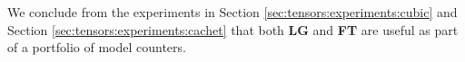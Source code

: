We conclude from the experiments in Section \ref{sec:tensors:experiments:cubic} and Section \ref{sec:tensors:experiments:cachet} that both \textbf{LG} and \textbf{FT} are useful as part of a portfolio of model counters.

